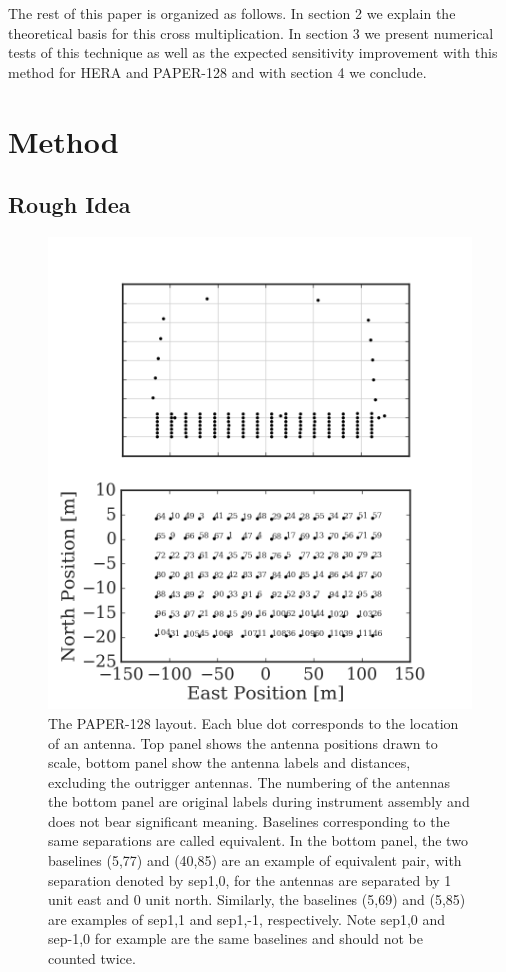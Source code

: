 \documentclass[twocolumn,apj,numberedappendix]{emulateapj}
\renewcommand\[{\begin{equation}}
\renewcommand\]{\end{equation}}
\begin{document}
The rest of this paper is organized as follows. In section
2 we explain the theoretical basis for this cross multiplication.
In section 3 we present numerical tests of
this technique as well as the expected sensitivity improvement
with this method for HERA and PAPER-128 and with section 4 we conclude. 


\section{Method}

\subsection{Rough Idea}

\begin{figure}[H]
\includegraphics[width=\linewidth]{antpos128}

\caption{The PAPER-128 layout. Each blue dot corresponds to the location of
an antenna. Top panel shows the antenna positions drawn to scale,
bottom panel show the antenna labels and distances, excluding the outrigger
antennas.
The numbering of the antennas the bottom panel are original labels
during instrument assembly and does not bear significant
meaning. Baselines corresponding to the same separations are called
equivalent. In the bottom panel, the two baselines (5,77) and (40,85) are an example of equivalent pair, with separation denoted by sep1,0, for the
antennas are separated by 1 unit east and 0 unit north. Similarly,
the baselines (5,69) and (5,85) are examples
of sep1,1 and sep1,-1, respectively. Note sep1,0 and sep-1,0 for example
are the same baselines and should not be counted twice.}
\label{fig:AntPos}
\end{figure}
\end{document}
